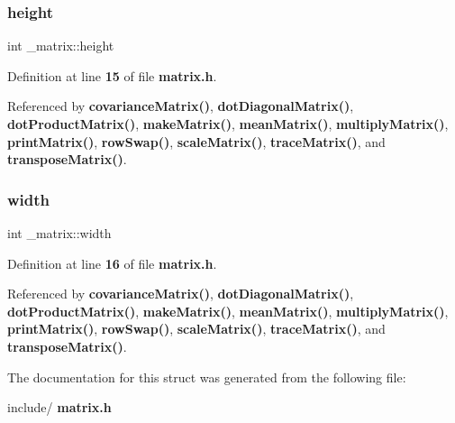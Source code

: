 \mbox{\label{struct__matrix_a8d3b2dbcf98704f11073d646273eb3b0}} 
\subsubsection{height}
{\footnotesize\ttfamily int \+\_\+matrix\+::height}



Definition at line \textbf{ 15} of file \textbf{ matrix.\+h}.



Referenced by \textbf{ covariance\+Matrix()}, \textbf{ dot\+Diagonal\+Matrix()}, \textbf{ dot\+Product\+Matrix()}, \textbf{ make\+Matrix()}, \textbf{ mean\+Matrix()}, \textbf{ multiply\+Matrix()}, \textbf{ print\+Matrix()}, \textbf{ row\+Swap()}, \textbf{ scale\+Matrix()}, \textbf{ trace\+Matrix()}, and \textbf{ transpose\+Matrix()}.

\mbox{\label{struct__matrix_a30d055d00e1b4afea4568f2aa1cf5c37}} 
\subsubsection{width}
{\footnotesize\ttfamily int \+\_\+matrix\+::width}



Definition at line \textbf{ 16} of file \textbf{ matrix.\+h}.



Referenced by \textbf{ covariance\+Matrix()}, \textbf{ dot\+Diagonal\+Matrix()}, \textbf{ dot\+Product\+Matrix()}, \textbf{ make\+Matrix()}, \textbf{ mean\+Matrix()}, \textbf{ multiply\+Matrix()}, \textbf{ print\+Matrix()}, \textbf{ row\+Swap()}, \textbf{ scale\+Matrix()}, \textbf{ trace\+Matrix()}, and \textbf{ transpose\+Matrix()}.



The documentation for this struct was generated from the following file\+:\begin{DoxyCompactItemize}
\item 
include/\textbf{ matrix.\+h}\end{DoxyCompactItemize}
